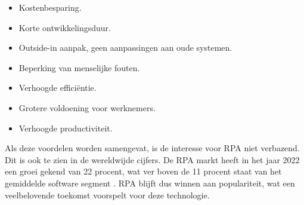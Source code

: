 \begin{itemize}
    \item Kostenbesparing.
    \item Korte ontwikkelingsduur.
    \item Outside-in aanpak, geen aanpassingen aan oude systemen.
    \item Beperking van menselijke fouten.
    \item Verhoogde efficiëntie.
    \item Grotere voldoening voor werknemers.
    \item Verhoogde productiviteit.
\end{itemize}

Als deze voordelen worden samengevat, is de interesse voor RPA niet verbazend. Dit is ook te zien in de wereldwijde cijfers. De RPA markt heeft in het jaar 2022 een groei gekend van 22 procent, wat ver boven de 11 procent staat van het gemiddelde software segment \autocite{Carter2023}.
RPA blijft dus winnen aan populariteit, wat een veelbelovende toekomst voorspelt voor deze technologie.